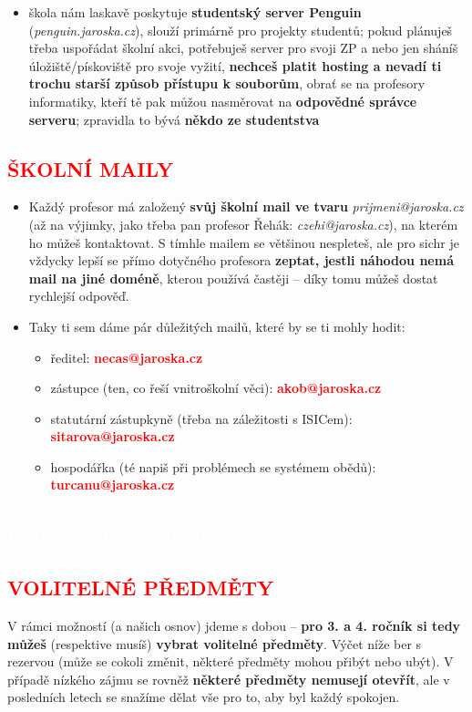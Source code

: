 \documentclass[a5paper, twoside]{article}
\newcommand{\polonadpis}[4]{
  \vspace*{-50pt}
  \begin{tcolorbox}[colback = #2, boxrule = 0pt, grow to left by = #4,  grow to right by = #4, arc=8pt, height = 30pt]
    \vspace*{5pt}
    \centering \subsection*{\textcolor{#3}{#1}}
  \end{tcolorbox}
}
\newcommand{\podnadpis}[2]{
  \subsection*{\textcolor{#2}{#1}}
}
\begin{document}
\begin{itemize}[leftmargin=10pt]
	\item  škola nám laskavě poskytuje \textbf{studentský server Penguin} (\textit{penguin.jaroska.cz}), slouží primárně pro projekty studentů; pokud plánuješ třeba uspořádat školní akci, potřebuješ server pro svoji ZP a nebo jen sháníš úložiště/pískoviště pro svoje vyžití, \textbf{nechceš platit hosting a nevadí ti trochu starší způsob přístupu k souborům}, obrať se na profesory informatiky, kteří tě pak můžou nasměrovat na \textbf{odpovědné správce serveru}; zpravidla to bývá \textbf{někdo ze studentstva}
\end{itemize}

\podnadpis{ŠKOLNÍ MAILY}{red}
\begin{itemize}[leftmargin=10pt]
	\item Každý profesor má založený \textbf{svůj školní mail ve tvaru} \textit{prijmeni@jaroska.cz} (až na výjimky, jako třeba pan profesor Řehák: \textit{czehi@jaroska.cz}), na kterém ho můžeš kontaktovat. S tímhle mailem se většinou nespleteš, ale pro sichr je vždycky lepší se přímo dotyčného profesora \textbf{zeptat, jestli náhodou nemá mail na jiné doméně}, kterou používá častěji -- díky tomu můžeš dostat rychlejší odpověď.
	\item  Taky ti sem dáme pár důležitých mailů, které by se ti mohly hodit:
  \begin{itemize}[leftmargin=0pt]
    \item  ředitel: \textcolor{red}{\textbf{necas@jaroska.cz}}
    \item zástupce (ten, co řeší vnitroškolní věci): \textcolor{red}{\textbf{akob@jaroska.cz}}
    \item statutární zástupkyně (třeba na záležitosti s ISICem): \textcolor{red}{\textbf{sitarova@jaroska.cz}}
    \item  hospodářka (té napiš při problémech se systémem obědů): \textcolor{red}{\textbf{turcanu@jaroska.cz}}
  \end{itemize}
\end{itemize}

\newpage

\polonadpis{I. Jak to u nás chodí}{red}{white}{-4.1cm}

\podnadpis{VOLITELNÉ PŘEDMĚTY}{red}

\noindent V rámci možností (a našich osnov) jdeme s dobou -- \textbf{pro 3. a 4. ročník si tedy
	můžeš} (respektive musíš) \textbf{vybrat volitelné předměty}. Výčet níže ber s rezervou
(může se cokoli změnit, některé předměty mohou přibýt nebo ubýt). V případě
nízkého zájmu se rovněž \textbf{některé předměty nemusejí otevřít}, ale v posledních
letech se snažíme dělat vše pro to, aby byl každý spokojen.
\end{document}
